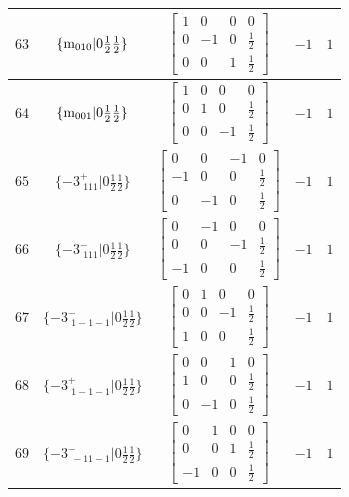 \documentclass[fleqn,8pt]{jsarticle}
\begin{document}
\begin{longtable}{ccccc}
$ 63 $ & $ \{{\rm m}_{010}|0 \frac{1}{2} \frac{1}{2}\} $ & $ \begin{bmatrix} 1 & 0 & 0 & 0 \\ 0 & -1 & 0 & \frac{1}{2} \\ 0 & 0 & 1 & \frac{1}{2} \end{bmatrix} $ & $ -1 $ & $ 1 $ \\ \hline
$ 64 $ & $ \{{\rm m}_{001}|0 \frac{1}{2} \frac{1}{2}\} $ & $ \begin{bmatrix} 1 & 0 & 0 & 0 \\ 0 & 1 & 0 & \frac{1}{2} \\ 0 & 0 & -1 & \frac{1}{2} \end{bmatrix} $ & $ -1 $ & $ 1 $ \\ \hline
$ 65 $ & $ \{-3^{+}_{\,\,111}|0 \frac{1}{2} \frac{1}{2}\} $ & $ \begin{bmatrix} 0 & 0 & -1 & 0 \\ -1 & 0 & 0 & \frac{1}{2} \\ 0 & -1 & 0 & \frac{1}{2} \end{bmatrix} $ & $ -1 $ & $ 1 $ \\ \hline
$ 66 $ & $ \{-3^{-}_{\,\,111}|0 \frac{1}{2} \frac{1}{2}\} $ & $ \begin{bmatrix} 0 & -1 & 0 & 0 \\ 0 & 0 & -1 & \frac{1}{2} \\ -1 & 0 & 0 & \frac{1}{2} \end{bmatrix} $ & $ -1 $ & $ 1 $ \\ \hline
$ 67 $ & $ \{-3^{-}_{\,\,1-1-1}|0 \frac{1}{2} \frac{1}{2}\} $ & $ \begin{bmatrix} 0 & 1 & 0 & 0 \\ 0 & 0 & -1 & \frac{1}{2} \\ 1 & 0 & 0 & \frac{1}{2} \end{bmatrix} $ & $ -1 $ & $ 1 $ \\ \hline
$ 68 $ & $ \{-3^{+}_{\,\,1-1-1}|0 \frac{1}{2} \frac{1}{2}\} $ & $ \begin{bmatrix} 0 & 0 & 1 & 0 \\ 1 & 0 & 0 & \frac{1}{2} \\ 0 & -1 & 0 & \frac{1}{2} \end{bmatrix} $ & $ -1 $ & $ 1 $ \\ \hline
$ 69 $ & $ \{-3^{-}_{\,\,-11-1}|0 \frac{1}{2} \frac{1}{2}\} $ & $ \begin{bmatrix} 0 & 1 & 0 & 0 \\ 0 & 0 & 1 & \frac{1}{2} \\ -1 & 0 & 0 & \frac{1}{2} \end{bmatrix} $ & $ -1 $ & $ 1 $ \\ \hline

\end{longtable}
\end{document}
